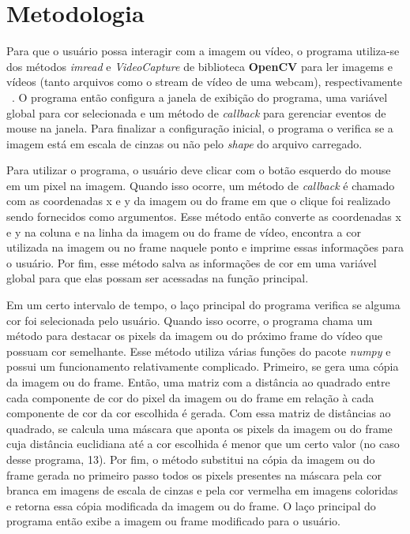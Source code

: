 \documentclass{bmvc2k}
\begin{document}

\section{Metodologia}
Para que o usuário possa interagir com a imagem ou vídeo, o programa utiliza-se dos métodos {\em imread} e {\em VideoCapture} de biblioteca {\bf OpenCV} para ler imagems e vídeos (tanto arquivos como o stream de vídeo de uma webcam), respectivamente ~\cite{OpenCV}. O programa então configura a janela de exibição do programa, uma variável global para cor selecionada e um método de {\em callback} para gerenciar eventos de mouse na janela. Para finalizar a configuração inicial, o programa o verifica se a imagem está em escala de cinzas ou não pelo {\em shape} do arquivo carregado.

Para utilizar o programa, o usuário deve clicar com o botão esquerdo do mouse em um pixel na imagem. Quando isso ocorre, um método de {\em callback} é chamado com as coordenadas x e y da imagem ou do frame em que o clique foi realizado sendo fornecidos como argumentos. Esse método então converte as coordenadas x e y na coluna e na linha da imagem ou do frame de vídeo, encontra a cor utilizada na imagem ou no frame naquele ponto e imprime essas informações para o usuário. Por fim, esse método salva as informações de cor em uma variável global para que elas possam ser acessadas na função principal.

Em um certo intervalo de tempo, o laço principal do programa verifica se alguma cor foi selecionada pelo usuário. Quando isso ocorre, o programa chama um método para destacar os pixels da imagem ou do próximo frame do vídeo que possuam cor semelhante. Esse método utiliza várias funções do pacote {\em numpy} e possui um funcionamento relativamente complicado. Primeiro, se gera uma cópia da imagem ou do frame. Então, uma matriz com a distância ao quadrado entre cada componente de cor do pixel da imagem ou do frame em relação à cada componente de cor da cor escolhida é gerada. Com essa matriz de distâncias ao quadrado, se calcula uma máscara que aponta os pixels da imagem ou do frame cuja distância euclidiana até a cor escolhida é menor que um certo valor (no caso desse programa, 13). Por fim, o método substitui na cópia da imagem ou do frame gerada no primeiro passo todos os pixels presentes na máscara pela cor branca em imagens de escala de cinzas e pela cor vermelha em imagens coloridas e retorna essa cópia modificada da imagem ou do frame. O laço principal do programa então exibe a imagem ou frame modificado para o usuário.
\end{document}
